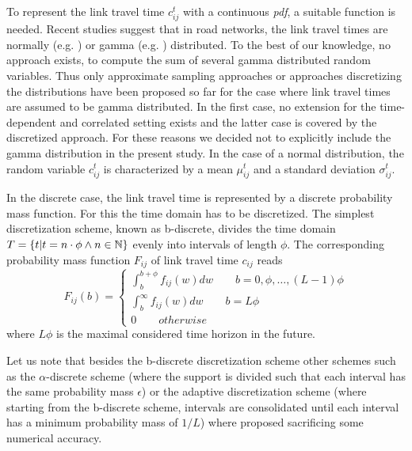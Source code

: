 To represent the link travel time $c_{ij}^t$ with a continuous \textit{pdf}, a
suitable function is needed. Recent studies suggest that in road networks, the link
travel times are normally (e.g. \cite{SesSri10}) or gamma
(e.g. \cite{ZocNieWuMah13}) distributed. To the best of our knowledge, no
approach exists, to compute the sum of several gamma distributed random
variables. Thus only approximate sampling approaches \cite{ZocNieWuMah13} or approaches discretizing the distributions \cite{NieWu09} have been proposed so far for the case where link travel times are assumed to be gamma distributed. In the first case, no extension for the time-dependent and correlated setting
exists and the latter case is covered by the discretized approach. For these
reasons we decided not to explicitly include the gamma distribution in the
present study. In the case of a normal distribution, the random variable
$c_{ij}^t$ is characterized by a mean $\mu_{ij}^t$ and a standard deviation $\sigma_{ij}^t$.

In the discrete case, the link travel time is represented by a discrete
probability mass function. For this the time domain has to be discretized.
The simplest discretization scheme, known as b-discrete, divides the time domain
$T = \{t | t = n\cdot \phi \wedge n \in \mathbb{N} \}$ evenly into intervals of length $\phi$.
The corresponding probability mass function $F_{ij}$ of link travel time
$c_{ij}$ reads
\begin{equation}
	F_{ij}(b) = \begin{cases}\int_b^{b+\phi}f_{ij}(w)dw \qquad b =
	0,\phi,\ldots, (L-1)\phi\\
	\int_b^{\infty}f_{ij}(w)dw \qquad b =
	L \phi\\
	0 \qquad otherwise
	\end{cases} 
\end{equation}
where $L \phi$ is the maximal considered time horizon in the future.

Let us note that besides the b-discrete discretization scheme other schemes
\cite{NieWuDilJohNel12} such as the $\alpha$-discrete scheme (where the support
is divided such that each interval has the same probability mass $\epsilon$) or
the adaptive discretization scheme (where starting from the b-discrete scheme,
intervals are consolidated until each interval has a minimum probability mass of
$1/L$) where proposed sacrificing some numerical accuracy.

